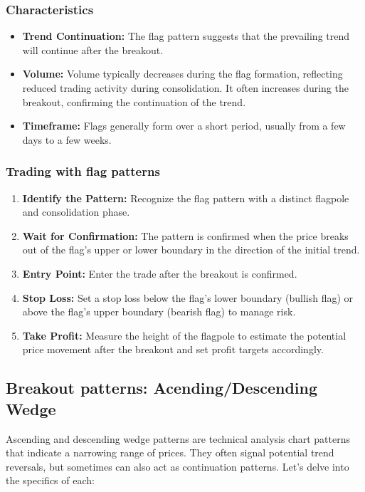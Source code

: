 \documentclass{report}
\begin{document}
     \bigbreak \noindent 
     \subsubsection{Characteristics}
     \begin{itemize}
         \item \textbf{Trend Continuation:} The flag pattern suggests that the prevailing trend will continue after the breakout.
         \item \textbf{Volume:} Volume typically decreases during the flag formation, reflecting reduced trading activity during consolidation. It often increases during the breakout, confirming the continuation of the trend.
         \item \textbf{Timeframe:} Flags generally form over a short period, usually from a few days to a few weeks.
     \end{itemize}

     \bigbreak \noindent 
     \subsubsection{Trading with flag patterns}
     \begin{enumerate}
         \item \textbf{Identify the Pattern:} Recognize the flag pattern with a distinct flagpole and consolidation phase.
         \item \textbf{Wait for Confirmation:} The pattern is confirmed when the price breaks out of the flag's upper or lower boundary in the direction of the initial trend.
         \item \textbf{Entry Point:} Enter the trade after the breakout is confirmed.
         \item \textbf{Stop Loss:} Set a stop loss below the flag's lower boundary (bullish flag) or above the flag's upper boundary (bearish flag) to manage risk.
         \item \textbf{Take Profit:} Measure the height of the flagpole to estimate the potential price movement after the breakout and set profit targets accordingly.
     \end{enumerate}


     \bigbreak \noindent 
     \bigbreak \noindent 

     \pagebreak 
     \subsection{Breakout patterns: Acending/Descending Wedge}
     \bigbreak \noindent 
     Ascending and descending wedge patterns are technical analysis chart patterns that indicate a narrowing range of prices. They often signal potential trend reversals, but sometimes can also act as continuation patterns. Let's delve into the specifics of each:
     \bigbreak \noindent 
\end{document}

